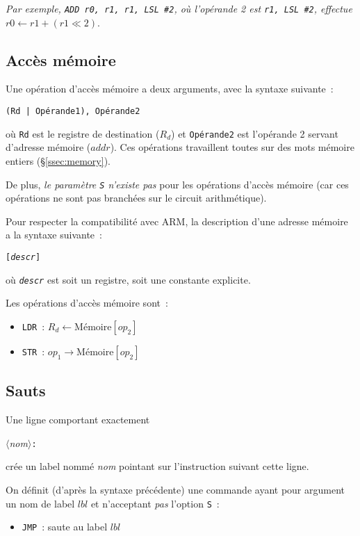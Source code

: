 \documentclass[11pt,a4paper]{article}
\begin{document}
\noindent\textit{Par exemple, \texttt{ADD r0, r1, r1, LSL \#{}2}, où l'opérande 2 est \texttt{r1, LSL \#{}2}, effectue} ${r0 \leftarrow r1 + (r1 \ll 2)}$.

\subsection{Accès mémoire}

Une opération d'accès mémoire a deux arguments, avec la syntaxe suivante~:

\begin{center}\texttt{(Rd~|~Opérande1), Opérande2}\end{center}

où \texttt{Rd} est le registre de destination ($R_d$) et \texttt{Opérande2} est l'opérande 2 servant d'adresse mémoire ($addr$). Ces opérations travaillent toutes sur des mots mémoire entiers (§\ref{ssec:memory}).

De plus, \emph{le paramètre \texttt{S} n'existe pas} pour les opérations d'accès mémoire (car ces opérations ne sont pas branchées sur le circuit arithmétique).

Pour respecter la compatibilité avec ARM, la description d'une adresse mémoire a la syntaxe suivante~:
\begin{center}\texttt{[\textit{descr}]}\end{center}
où \texttt{\textit{descr}} est soit un registre, soit une constante explicite.

Les opérations d'accès mémoire sont~:

\begin{itemize}
\item \texttt{LDR}~: $R_d \leftarrow  \text{Mémoire}[op_2]$
\item \texttt{STR}~: $op_1 \rightarrow \text{Mémoire}[op_2]$
\end{itemize}

\subsection{Sauts}

Une ligne comportant exactement
\begin{center}\textit{$\langle$nom$\rangle$}\texttt{:}\end{center}
\noindent{}crée un label nommé \textit{nom} pointant sur l'instruction suivant cette ligne.

On définit (d'après la syntaxe précédente) une commande ayant pour argument un nom de label $lbl$ et n'acceptant \emph{pas} l'option \texttt{S}~:
\begin{itemize}
\item \texttt{JMP}~: saute au label $lbl$
\end{itemize}
\end{document}
